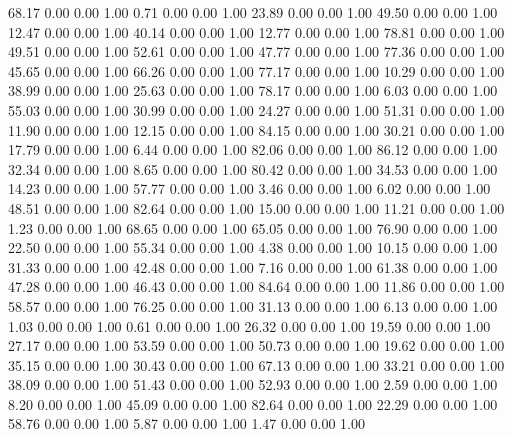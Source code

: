    68.17   0.00   0.00   1.00
    0.71   0.00   0.00   1.00
   23.89   0.00   0.00   1.00
   49.50   0.00   0.00   1.00
   12.47   0.00   0.00   1.00
   40.14   0.00   0.00   1.00
   12.77   0.00   0.00   1.00
   78.81   0.00   0.00   1.00
   49.51   0.00   0.00   1.00
   52.61   0.00   0.00   1.00
   47.77   0.00   0.00   1.00
   77.36   0.00   0.00   1.00
   45.65   0.00   0.00   1.00
   66.26   0.00   0.00   1.00
   77.17   0.00   0.00   1.00
   10.29   0.00   0.00   1.00
   38.99   0.00   0.00   1.00
   25.63   0.00   0.00   1.00
   78.17   0.00   0.00   1.00
    6.03   0.00   0.00   1.00
   55.03   0.00   0.00   1.00
   30.99   0.00   0.00   1.00
   24.27   0.00   0.00   1.00
   51.31   0.00   0.00   1.00
   11.90   0.00   0.00   1.00
   12.15   0.00   0.00   1.00
   84.15   0.00   0.00   1.00
   30.21   0.00   0.00   1.00
   17.79   0.00   0.00   1.00
    6.44   0.00   0.00   1.00
   82.06   0.00   0.00   1.00
   86.12   0.00   0.00   1.00
   32.34   0.00   0.00   1.00
    8.65   0.00   0.00   1.00
   80.42   0.00   0.00   1.00
   34.53   0.00   0.00   1.00
   14.23   0.00   0.00   1.00
   57.77   0.00   0.00   1.00
    3.46   0.00   0.00   1.00
    6.02   0.00   0.00   1.00
   48.51   0.00   0.00   1.00
   82.64   0.00   0.00   1.00
   15.00   0.00   0.00   1.00
   11.21   0.00   0.00   1.00
    1.23   0.00   0.00   1.00
   68.65   0.00   0.00   1.00
   65.05   0.00   0.00   1.00
   76.90   0.00   0.00   1.00
   22.50   0.00   0.00   1.00
   55.34   0.00   0.00   1.00
    4.38   0.00   0.00   1.00
   10.15   0.00   0.00   1.00
   31.33   0.00   0.00   1.00
   42.48   0.00   0.00   1.00
    7.16   0.00   0.00   1.00
   61.38   0.00   0.00   1.00
   47.28   0.00   0.00   1.00
   46.43   0.00   0.00   1.00
   84.64   0.00   0.00   1.00
   11.86   0.00   0.00   1.00
   58.57   0.00   0.00   1.00
   76.25   0.00   0.00   1.00
   31.13   0.00   0.00   1.00
    6.13   0.00   0.00   1.00
    1.03   0.00   0.00   1.00
    0.61   0.00   0.00   1.00
   26.32   0.00   0.00   1.00
   19.59   0.00   0.00   1.00
   27.17   0.00   0.00   1.00
   53.59   0.00   0.00   1.00
   50.73   0.00   0.00   1.00
   19.62   0.00   0.00   1.00
   35.15   0.00   0.00   1.00
   30.43   0.00   0.00   1.00
   67.13   0.00   0.00   1.00
   33.21   0.00   0.00   1.00
   38.09   0.00   0.00   1.00
   51.43   0.00   0.00   1.00
   52.93   0.00   0.00   1.00
    2.59   0.00   0.00   1.00
    8.20   0.00   0.00   1.00
   45.09   0.00   0.00   1.00
   82.64   0.00   0.00   1.00
   22.29   0.00   0.00   1.00
   58.76   0.00   0.00   1.00
    5.87   0.00   0.00   1.00
    1.47   0.00   0.00   1.00
